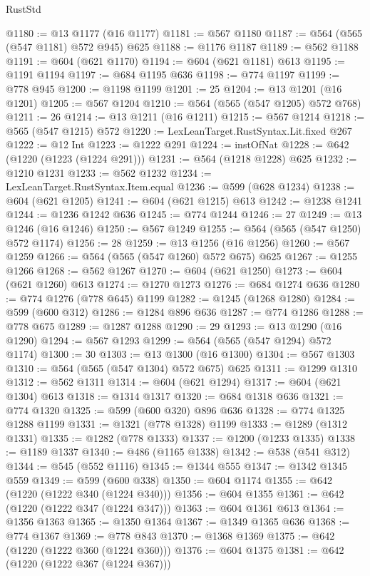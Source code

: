 \begin{lexlean}{RustStd}
\begin{coremodule}
{\begin{coremodule}
{{{{{{{{{{{{{@1180 := @13 @1177 (@16 @1177)
@1181 := @567 @1180
@1187 := @564 (@565 (@547 @1181) @572 @945) @625
@1188 := @1176 @1187
@1189 := @562 @1188
@1191 := @604 (@621 @1170)
@1194 := @604 (@621 @1181) @613
@1195 := @1191 @1194
@1197 := @684 @1195 @636
@1198 := @774 @1197
@1199 := @778 @945
@1200 := @1198 @1199
@1201 := 25
@1204 := @13 @1201 (@16 @1201)
@1205 := @567 @1204
@1210 := @564 (@565 (@547 @1205) @572 @768)
@1211 := 26
@1214 := @13 @1211 (@16 @1211)
@1215 := @567 @1214
@1218 := @565 (@547 @1215) @572
@1220 := LexLeanTarget.RustSyntax.Lit.fixed @267
@1222 := @12 Int
@1223 := @1222 @291
@1224 := instOfNat
@1228 := @642 (@1220 (@1223 (@1224 @291)))
@1231 := @564 (@1218 @1228) @625
@1232 := @1210 @1231
@1233 := @562 @1232
@1234 := LexLeanTarget.RustSyntax.Item.equal
@1236 := @599 (@628 @1234)
@1238 := @604 (@621 @1205)
@1241 := @604 (@621 @1215) @613
@1242 := @1238 @1241
@1244 := @1236 @1242 @636
@1245 := @774 @1244
@1246 := 27
@1249 := @13 @1246 (@16 @1246)
@1250 := @567 @1249
@1255 := @564 (@565 (@547 @1250) @572 @1174)
@1256 := 28
@1259 := @13 @1256 (@16 @1256)
@1260 := @567 @1259
@1266 := @564 (@565 (@547 @1260) @572 @675) @625
@1267 := @1255 @1266
@1268 := @562 @1267
@1270 := @604 (@621 @1250)
@1273 := @604 (@621 @1260) @613
@1274 := @1270 @1273
@1276 := @684 @1274 @636
@1280 := @774 @1276 (@778 @645) @1199
@1282 := @1245 (@1268 @1280)
@1284 := @599 (@600 @312)
@1286 := @1284 @896 @636
@1287 := @774 @1286
@1288 := @778 @675
@1289 := @1287 @1288
@1290 := 29
@1293 := @13 @1290 (@16 @1290)
@1294 := @567 @1293
@1299 := @564 (@565 (@547 @1294) @572 @1174)
@1300 := 30
@1303 := @13 @1300 (@16 @1300)
@1304 := @567 @1303
@1310 := @564 (@565 (@547 @1304) @572 @675) @625
@1311 := @1299 @1310
@1312 := @562 @1311
@1314 := @604 (@621 @1294)
@1317 := @604 (@621 @1304) @613
@1318 := @1314 @1317
@1320 := @684 @1318 @636
@1321 := @774 @1320
@1325 := @599 (@600 @320) @896 @636
@1328 := @774 @1325 @1288 @1199
@1331 := @1321 (@778 @1328) @1199
@1333 := @1289 (@1312 @1331)
@1335 := @1282 (@778 @1333)
@1337 := @1200 (@1233 @1335)
@1338 := @1189 @1337
@1340 := @486 (@1165 @1338)
@1342 := @538 (@541 @312)
@1344 := @545 (@552 @1116)
@1345 := @1344 @555
@1347 := @1342 @1345 @559
@1349 := @599 (@600 @338)
@1350 := @604 @1174
@1355 := @642 (@1220 (@1222 @340 (@1224 @340)))
@1356 := @604 @1355
@1361 := @642 (@1220 (@1222 @347 (@1224 @347)))
@1363 := @604 @1361 @613
@1364 := @1356 @1363
@1365 := @1350 @1364
@1367 := @1349 @1365 @636
@1368 := @774 @1367
@1369 := @778 @843
@1370 := @1368 @1369
@1375 := @642 (@1220 (@1222 @360 (@1224 @360)))
@1376 := @604 @1375
@1381 := @642 (@1220 (@1222 @367 (@1224 @367)))
}}}}}}}}}}}}}
\end{coremodule}}
\end{coremodule}
\end{lexlean}
